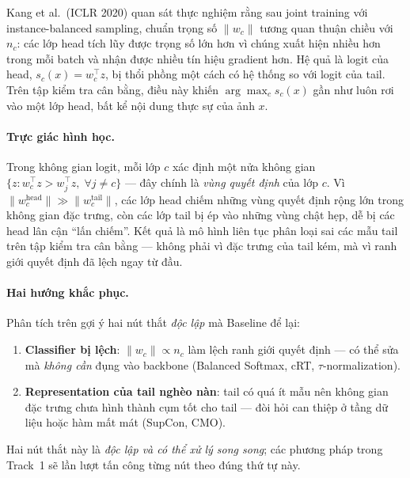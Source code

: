 Kang et al.\ (ICLR 2020) quan sát thực nghiệm rằng sau joint training với
instance-balanced sampling, chuẩn trọng số $\lVert w_c \rVert$ tương quan thuận
chiều với $n_c$: các lớp head tích lũy được trọng số lớn hơn vì chúng xuất hiện
nhiều hơn trong mỗi batch và nhận được nhiều tín hiệu gradient hơn.
Hệ quả là logit của head,
$s_c(x) = w_c^\top z$,
bị thổi phồng một cách có hệ thống so với logit của tail.
Trên tập kiểm tra cân bằng, điều này khiến $\arg\max_c s_c(x)$ gần như luôn rơi
vào một lớp head, bất kể nội dung thực sự của ảnh $x$.

\paragraph{Trực giác hình học.}

Trong không gian logit, mỗi lớp $c$ xác định một nửa không gian
$\{z : w_c^\top z > w_j^\top z,\; \forall j \neq c\}$ --- đây chính là
\emph{vùng quyết định} của lớp $c$.
Vì $\lVert w_c^{\text{head}} \rVert \gg \lVert w_c^{\text{tail}} \rVert$,
các lớp head chiếm những vùng quyết định rộng lớn trong không gian đặc trưng,
còn các lớp tail bị ép vào những vùng chật hẹp, dễ bị các head lân cận ``lấn chiếm''.
Kết quả là mô hình liên tục phân loại sai các mẫu tail trên tập kiểm tra cân bằng ---
không phải vì đặc trưng của tail kém, mà vì ranh giới quyết định đã lệch ngay từ đầu.

\paragraph{Hai hướng khắc phục.}

Phân tích trên gợi ý hai nút thắt \emph{độc lập} mà Baseline để lại:
\begin{enumerate}[label=($\alph*$)]
    \item \textbf{Classifier bị lệch}: 
    $\lVert w_c \rVert \propto n_c$ làm lệch
          ranh giới quyết định --- có thể sửa mà \emph{không cần} đụng vào backbone
          (Balanced Softmax, cRT, $\tau$-normalization).
    \item \textbf{Representation của tail nghèo nàn}: tail có quá ít mẫu nên
          không gian đặc trưng chưa hình thành cụm tốt cho tail ---
          đòi hỏi can thiệp ở tầng dữ liệu hoặc hàm mất mát
          (SupCon, CMO).
\end{enumerate}
Hai nút thắt này là \emph{độc lập và có thể xử lý song song};
các phương pháp trong Track~1 sẽ lần lượt tấn công từng nút theo đúng thứ tự này.


